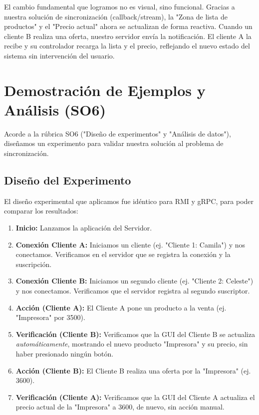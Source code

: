\documentclass[11pt, a4paper]{article}
\begin{document}
El cambio fundamental que logramos no es visual, sino funcional.
Gracias a nuestra solución de sincronización (callback/stream), la "Zona de lista de productos" y el "Precio actual" ahora se actualizan de forma reactiva.
Cuando un cliente B realiza una oferta, nuestro servidor envía la notificación. El cliente A la recibe y su controlador recarga la lista y el precio, reflejando el nuevo estado del sistema sin intervención del usuario.

\section{Demostración de Ejemplos y Análisis (SO6)}
\label{sec:demo}

Acorde a la rúbrica SO6 ("Diseño de experimentos" y "Análisis de datos"), diseñamos un experimento para validar nuestra solución al problema de sincronización.

\subsection{Diseño del Experimento}
El diseño experimental que aplicamos fue idéntico para RMI y gRPC, para poder comparar los resultados:
\begin{enumerate}
    \item \textbf{Inicio:} Lanzamos la aplicación del Servidor.
    \item \textbf{Conexión Cliente A:} Iniciamos un cliente (ej. "Cliente 1: Camila") y nos conectamos. Verificamos en el servidor que se registra la conexión y la suscripción.
    \item \textbf{Conexión Cliente B:} Iniciamos un segundo cliente (ej. "Cliente 2: Celeste") y nos conectamos. Verificamos que el servidor registra al segundo suscriptor.
    \item \textbf{Acción (Cliente A):} El Cliente A pone un producto a la venta (ej. "Impresora" por 3500).
    \item \textbf{Verificación (Cliente B):} Verificamos que la GUI del Cliente B se actualiza \textit{automáticamente}, mostrando el nuevo producto "Impresora" y su precio, sin haber presionado ningún botón.
    \item \textbf{Acción (Cliente B):} El Cliente B realiza una oferta por la "Impresora" (ej. 3600).
    \item \textbf{Verificación (Cliente A):} Verificamos que la GUI del Cliente A actualiza el precio actual de la "Impresora" a 3600, de nuevo, sin acción manual.
\end{enumerate}
\end{document}
